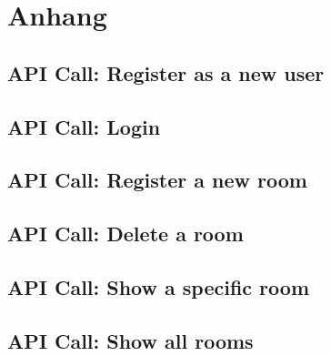 \section{Anhang}


%


\subsection{API Call: Register as a new user}
\label{app:API_register}

\subsection{API Call: Login}
\label{app:API_login}

\subsection{API Call: Register a new room}
\label{app:API_register_room}

\subsection{API Call: Delete a room}
\label{app:API_delete_room}

\subsection{API Call: Show a specific room}
\label{app:API_show_room}

\subsection{API Call: Show all rooms}
\label{app:API_show_rooms}

